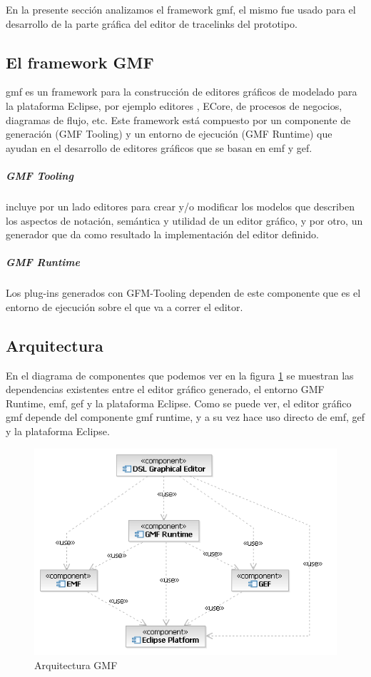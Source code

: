 \documentclass[a4paper,12pt,oneside,spanish]{book}
\begin{document}
En la presente sección analizamos el framework \gls{gmf}, el mismo fue usado para el desarrollo de la parte gráfica del editor de tracelinks del prototipo.

\subsection{El framework GMF}

\gls{gmf} es un framework para la construcción de editores gráficos de modelado para la plataforma Eclipse, por ejemplo editores , ECore, de procesos de negocios, diagramas de flujo, etc. Este framework está compuesto por un componente de generación (GMF Tooling) y un entorno de ejecución (GMF Runtime) que ayudan en el desarrollo de editores gráficos que se basan en \gls{emf} y \gls{gef}.

\subparagraph{GMF Tooling} incluye por un lado editores para crear y/o modificar los modelos que describen los aspectos de notación, semántica y utilidad de un editor gráfico, y por otro, un generador que da como resultado la implementación del editor definido.

\subparagraph{GMF Runtime} Los plug-ins generados con GFM-Tooling dependen de este componente que es el entorno de ejecución sobre el que va a correr el editor.

\subsection{Arquitectura}

En el diagrama de componentes que podemos ver en la figura \ref{fig:GMFArquitectura} se muestran las dependencias existentes entre el editor gráfico generado, el entorno GMF Runtime, \gls{emf}, \gls{gef} y la plataforma Eclipse. Como se puede ver, el editor gráfico \gls{gmf} depende del componente \gls{gmf} runtime, y a su vez hace uso directo de \gls{emf}, \gls{gef} y la plataforma Eclipse.


\begin{figure}[hbtp]
\centering
\includegraphics[scale=.75]{./img/GMFArquitectura}
\caption{Arquitectura GMF}
\label{fig:GMFArquitectura}
\end{figure}
\end{document}

